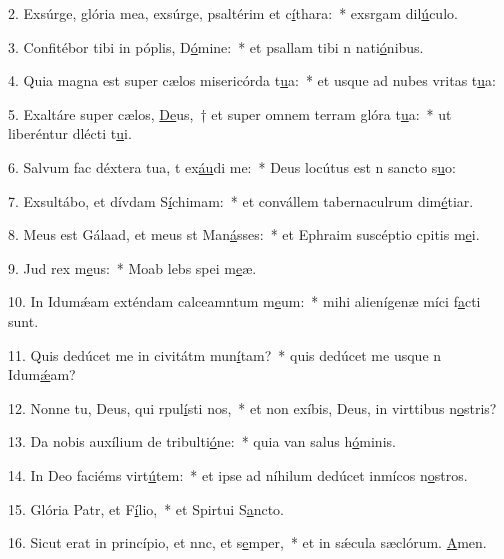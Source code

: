 2. Exsúrge, glória mea, exsúrge, psaltérim et c\uline{í}thara:~* exsrgam dil\uline{ú}culo.\par 
3. Confitébor tibi in póplis, D\uline{ó}mine:~* et psallam tibi n nati\uline{ó}nibus.\par 
4. Quia magna est super cælos misericórda t\uline{u}a:~* et usque ad nubes vritas t\uline{u}a:\par 
5. Exaltáre super cælos, \uline{De}us,~† et super omnem terram glóra t\uline{u}a:~* ut liberéntur dlécti t\uline{u}i.\par 
6. Salvum fac déxtera tua, t ex\uline{áu}di me:~* Deus locútus est n sancto s\uline{u}o:\par 
7. Exsultábo, et dívdam S\uline{í}chimam:~* et convállem tabernaculrum dim\uline{é}tiar.\par 
8. Meus est Gálaad, et meus st Man\uline{á}sses:~* et Ephraim suscéptio cpitis m\uline{e}i.\par 
9. Jud rex m\uline{e}us:~* Moab lebs spei m\uline{e}æ.\par 
10. In Idumǽam exténdam calceamntum m\uline{e}um:~* mihi alienígenæ míci f\uline{a}cti sunt.\par 
11. Quis dedúcet me in civitátm mun\uline{í}tam?~* quis dedúcet me usque n Idum\uline{ǽ}am?\par 
12. Nonne tu, Deus, qui rpul\uline{í}sti nos,~* et non exíbis, Deus, in virttibus n\uline{o}stris?\par 
13. Da nobis auxílium de tribulti\uline{ó}ne:~* quia van salus h\uline{ó}minis.\par 
14. In Deo faciéms virt\uline{ú}tem:~* et ipse ad níhilum dedúcet inmícos n\uline{o}stros.\par 
15. Glória Patr, et F\uline{í}lio,~* et Spirtui S\uline{a}ncto.\par 
16. Sicut erat in princípio, et nnc, et s\uline{e}mper,~* et in sǽcula sæclórum. \uline{A}men.\par 
